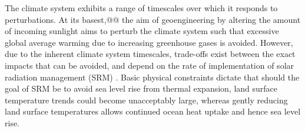 \documentclass[grl]{AGUTeX}  %
\begin{document}
\begin{article}
The climate system exhibits a range of timescales over which it responds to perturbations. At its basest,@@ the aim of geoengineering by altering the amount of incoming sunlight aims to perturb the climate system such that excessive global average warming due to increasing greenhouse gases is avoided. However, due to the inherent climate system timescales, trade-offs exist between the exact impacts that can be avoided, and depend on the rate of implementation of solar radiation management (SRM) \citep{irvine12}. Basic physical constraints dictate that should the goal of SRM be to avoid sea level rise from thermal expansion, land surface temperature trends could become unacceptably large, whereas gently reducing land surface temperatures allows continued ocean heat uptake and hence sea level rise. 



\end{article}
\end{document}

